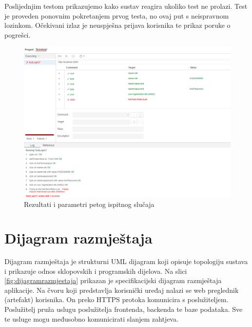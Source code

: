 		Poslijednjim testom prikazujemo kako sustav reagira ukoliko test ne prolazi. Test je proveden ponovnim pokretanjem prvog testa, no ovaj put s neispravnom lozinkom. Očekivani izlaz je neuspješna prijava korisnika te prikaz poruke o pogrešci.
		
		\begin{figure}[H]
			\includegraphics[width=\textwidth]{slike/neispravnaPrijava.PNG} %
			\caption{Rezultati i parametri petog ispitnog slučaja}
			\label{fig:neispravnaPrijavaTest} %
		\end{figure}
		\eject
		
		\section{Dijagram razmještaja}
			
			 
			 Dijagram razmještaja je strukturni UML dijagram koji opisuje topologiju sustava i prikazuje odnos sklopovskih i programskih dijelova. Na slici \ref{fig:dijagramrazmjestaja} prikazan je specifikacijski dijagram razmještaja aplikacije. Na čvoru koji predstavlja korisnički uređaj nalazi se web preglednik (artefakt) korisnika. On preko HTTPS protoka komunicira s poslužiteljem. Poslužitelj pruža uslugu poslužitelja frontenda, backenda te baze podataka. Sve te usluge mogu međusobno komunicirati slanjem zahtjeva.
			 
